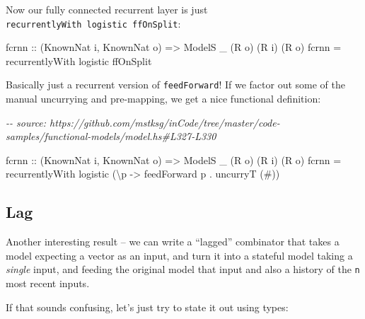 \documentclass[]{article}
\newenvironment{Shaded}{}{}
\newcommand{\CommentTok}[1]{\textcolor[rgb]{0.38,0.63,0.69}{\textit{#1}}}
\newcommand{\DataTypeTok}[1]{\textcolor[rgb]{0.56,0.13,0.00}{#1}}
\newcommand{\NormalTok}[1]{#1}
\newcommand{\OperatorTok}[1]{\textcolor[rgb]{0.40,0.40,0.40}{#1}}
\newcommand{\OtherTok}[1]{\textcolor[rgb]{0.00,0.44,0.13}{#1}}
\begin{document}
Now our fully connected recurrent layer is just
\texttt{recurrentlyWith\ logistic\ ffOnSplit}:

\begin{Shaded}
\begin{Highlighting}[]
\NormalTok{fcrnn\textquotesingle{}}
\OtherTok{    ::}\NormalTok{ (}\DataTypeTok{KnownNat}\NormalTok{ i, }\DataTypeTok{KnownNat}\NormalTok{ o)}
    \OtherTok{=\textgreater{}} \DataTypeTok{ModelS}\NormalTok{ \_ (}\DataTypeTok{R}\NormalTok{ o) (}\DataTypeTok{R}\NormalTok{ i) (}\DataTypeTok{R}\NormalTok{ o)}
\NormalTok{fcrnn\textquotesingle{} }\OtherTok{=}\NormalTok{ recurrentlyWith logistic ffOnSplit}
\end{Highlighting}
\end{Shaded}

Basically just a recurrent version of \texttt{feedForward}! If we factor out
some of the manual uncurrying and pre-mapping, we get a nice functional
definition:

\begin{Shaded}
\begin{Highlighting}[]
\CommentTok{{-}{-} source: https://github.com/mstksg/inCode/tree/master/code{-}samples/functional{-}models/model.hs\#L327{-}L330}

\NormalTok{fcrnn\textquotesingle{}}
\OtherTok{    ::}\NormalTok{ (}\DataTypeTok{KnownNat}\NormalTok{ i, }\DataTypeTok{KnownNat}\NormalTok{ o)}
    \OtherTok{=\textgreater{}} \DataTypeTok{ModelS}\NormalTok{ \_ (}\DataTypeTok{R}\NormalTok{ o) (}\DataTypeTok{R}\NormalTok{ i) (}\DataTypeTok{R}\NormalTok{ o)}
\NormalTok{fcrnn\textquotesingle{} }\OtherTok{=}\NormalTok{ recurrentlyWith logistic (\textbackslash{}p }\OtherTok{{-}\textgreater{}}\NormalTok{ feedForward p }\OperatorTok{.}\NormalTok{ uncurryT (}\OperatorTok{\#}\NormalTok{))}
\end{Highlighting}
\end{Shaded}

\subsection{Lag}\label{lag}

Another interesting result -- we can write a ``lagged'' combinator that takes a
model expecting a vector as an input, and turn it into a stateful model taking a
\emph{single} input, and feeding the original model that input and also a
history of the \texttt{n} most recent inputs.

If that sounds confusing, let's just try to state it out using types:
\end{document}
